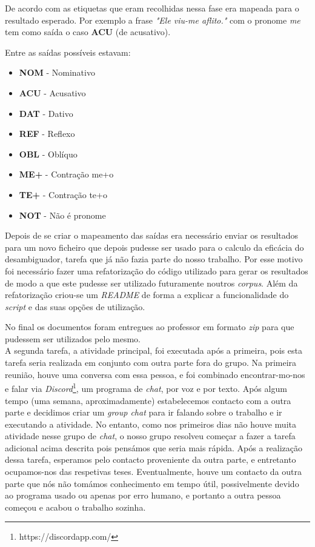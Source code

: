 \documentclass[a4paper,12pt,journal,twoside,compsoc]{PPIEEEtran}
\begin{document}
De acordo com as etiquetas que eram recolhidas nessa fase era mapeada para o resultado esperado.
Por exemplo a frase \textit{"Ele viu-me aflito."} com o pronome \textit{me} tem como saída o caso \textbf{ACU} (de acusativo).

Entre as saídas possíveis estavam:
\begin{itemize}
\item \textbf{NOM} - Nominativo
\item \textbf{ACU} - Acusativo
\item \textbf{DAT} - Dativo
\item \textbf{REF} - Reflexo
\item \textbf{OBL} - Oblíquo
\item \textbf{ME+} - Contração me+o
\item \textbf{TE+} - Contração te+o
\item \textbf{NOT} - Não é pronome
\end{itemize}

Depois de se criar o mapeamento das saídas era necessário enviar os resultados para um novo ficheiro que depois pudesse ser usado para o calculo da eficácia do desambiguador, tarefa que já não fazia parte do nosso trabalho. Por esse motivo foi necessário fazer uma refatorização do código utilizado para gerar os resultados de modo a que este pudesse ser utilizado futuramente noutros \textit{corpus}. Além da refatorização criou-se um \textit{README} de forma a explicar a funcionalidade do \textit{script} e das suas opções de utilização.

No final os documentos foram entregues ao professor em formato \textit{zip} para que pudessem ser utilizados pelo mesmo. \\


A segunda tarefa, a atividade principal, foi executada após a primeira, pois esta tarefa seria realizada em conjunto com outra parte fora do grupo. Na primeira reunião, houve uma conversa com essa pessoa, e foi combinado encontrar-mo-nos e falar via \textit{Discord}\footnote{https://discordapp.com/}, um programa de \textit{chat}, por voz e por texto. Após algum tempo (uma semana, aproximadamente) estabelecemos contacto com a outra parte e decidimos criar um \textit{group chat} para ir falando sobre o trabalho e ir executando a atividade. No entanto, como nos primeiros dias não houve muita atividade nesse grupo de \textit{chat}, o nosso grupo resolveu começar a fazer a tarefa adicional acima descrita pois pensámos que seria mais rápida. Após a realização dessa tarefa,  esperamos pelo contacto proveniente da outra parte, e entretanto ocupamos-nos das respetivas teses. Eventualmente, houve um contacto da outra parte que nós não tomámos conhecimento em tempo útil, possivelmente devido ao programa usado ou apenas por erro humano, e portanto a outra pessoa começou e acabou o trabalho sozinha.
\end{document}
